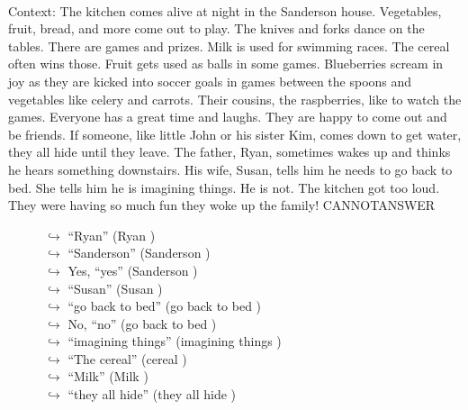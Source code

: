 \documentclass[11pt,a4paper, onecolumn]{article}
\begin{document}
\\ Context: The kitchen comes alive at night in the Sanderson house. Vegetables, fruit, bread, and more come out to play. The knives and forks dance on the tables. There are games and prizes. Milk is used for swimming races. The cereal often wins those. Fruit gets used as balls in some games. Blueberries scream in joy as they are kicked into soccer goals in games between the spoons and vegetables like celery and carrots. Their cousins, the raspberries, like to watch the games. Everyone has a great time and laughs. They are happy to come out and be friends. If someone, like little John or his sister Kim, comes down to get water, they all hide until they leave. The father, Ryan, sometimes wakes up and thinks he hears something downstairs. His wife, Susan, tells him he needs to go back to bed. She tells him he is imagining things. He is not. The kitchen got too loud. They were having so much fun they woke up the family! CANNOTANSWER

\begin{figure}[t] \small \begin{tcolorbox}[boxsep=0pt,left=5pt,right=0pt,top=2pt,colback = yellow!5] \begin{dialogue}
 \small 
\colorbox{pink!25}{$\hookrightarrow$}
{ ``Ryan'' (Ryan ) }
\\
\colorbox{pink!25}{$\hookrightarrow$}
{ ``Sanderson'' (Sanderson ) }
\\
\colorbox{pink!25}{$\hookrightarrow$}
\colorbox{red!25}{Yes,}
{ ``yes'' (Sanderson ) }
\\
\colorbox{pink!25}{$\hookrightarrow$}
{ ``Susan'' (Susan ) }
\\
\colorbox{pink!25}{$\hookrightarrow$}
{ ``go back to bed'' (go back to bed ) }
\\
\colorbox{pink!25}{$\hookrightarrow$}
\colorbox{red!25}{No,}
{ ``no'' (go back to bed ) }
\\
\colorbox{pink!25}{$\hookrightarrow$}
{ ``imagining things'' (imagining things ) }
\\
\colorbox{pink!25}{$\hookrightarrow$}
{ ``The cereal'' (cereal ) }
\\
\colorbox{pink!25}{$\hookrightarrow$}
{ ``Milk'' (Milk ) }
\\
\colorbox{pink!25}{$\hookrightarrow$}
{ ``they all hide'' (they all hide ) }
\\
 \end{dialogue}\end{tcolorbox}\end{figure}
\end{document}
